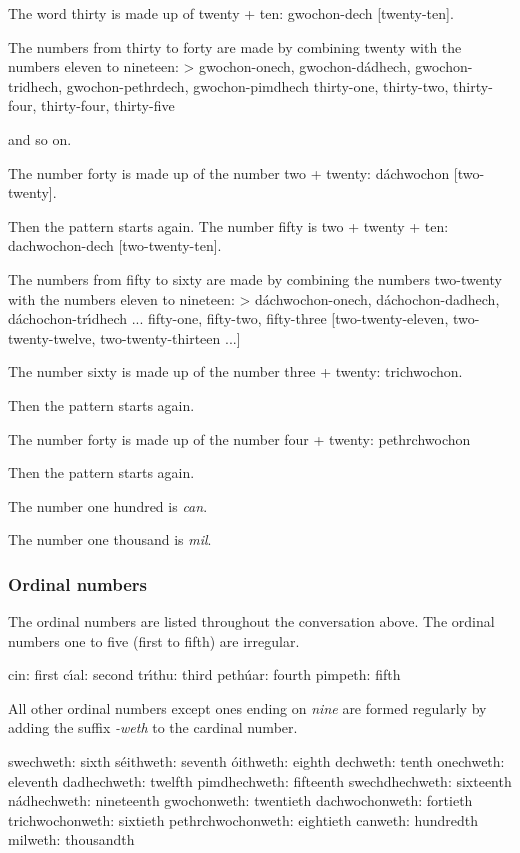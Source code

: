 The word thirty is made up of twenty + ten: gwochon-dech [twenty-ten].

The numbers from thirty to forty are made by combining twenty with the numbers eleven to nineteen:
> gwochon-onech, gwochon-d\'{a}dhech, gwochon-tridhech, gwochon-pethrdech, gwochon-pimdhech
thirty-one, thirty-two, thirty-four, thirty-four, thirty-five

and so on.

The number forty is made up of the number two + twenty: d\'{a}chwochon [two-twenty].

Then the pattern starts again. The number fifty is two + twenty + ten: dachwochon-dech [two-twenty-ten].

The numbers from fifty to sixty are made by combining the numbers two-twenty with the numbers eleven to nineteen:
> d\'{a}chwochon-onech, d\'{a}chochon-dadhech, d\'{a}chochon-tr\'{\i}dhech ...
fifty-one, fifty-two, fifty-three
[two-twenty-eleven, two-twenty-twelve, two-twenty-thirteen ...]

The number sixty is made up of the number three + twenty: trichwochon.

Then the pattern starts again.

The number forty is made up of the number four + twenty: pethrchwochon

Then the pattern starts again.

The number one hundred is \textit{can}.

The number one thousand is \textit{mil}.

\subsubsection{Ordinal numbers}

The ordinal numbers are listed throughout the conversation above. The ordinal numbers one to five (first to fifth) are irregular.

cin: first
c\'{\i}al: second
tr\'{\i}thu: third
peth\'{u}ar: fourth
pimpeth: fifth

All other ordinal numbers except ones ending on \textit{nine} are formed regularly by adding the suffix \textit{-weth} to the cardinal number.

swechweth: sixth
s\'{e}ithweth: seventh
\'{o}ithweth: eighth
dechweth: tenth
onechweth: eleventh
dadhechweth: twelfth
pimdhechweth: fifteenth
swechdhechweth: sixteenth
n\'{a}dhechweth: nineteenth
gwochonweth: twentieth
dachwochonweth: fortieth
trichwochonweth: sixtieth
pethrchwochonweth: eightieth
canweth: hundredth
milweth: thousandth

